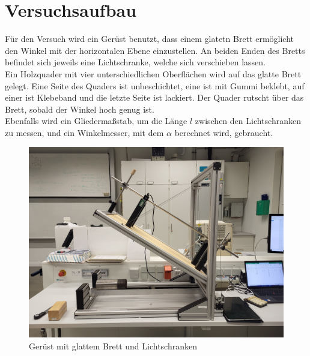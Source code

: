 \section{Versuchsaufbau}

Für den Versuch wird ein Gerüst benutzt, dass einem glatetn Brett ermöglicht den Winkel mit der horizontalen Ebene einzustellen. An beiden Enden des Bretts befindet sich jeweils eine Lichtschranke, welche sich verschieben lassen.\\
Ein Holzquader mit vier unterschiedlichen Oberflächen wird auf das glatte Brett gelegt. Eine Seite des Quaders ist unbeschichtet, eine ist mit Gummi beklebt, auf einer ist Klebeband und die letzte Seite ist lackiert. Der Quader rutscht über das Brett, sobald der Winkel hoch genug ist.\\
Ebenfalls wird ein Gliedermaßstab, um die Länge $l$ zwischen den Lichtschranken zu messen, und ein Winkelmesser, mit dem $\alpha$ berechnet wird, gebraucht.
\begin{figure}[ht]
    \centering
    \includegraphics[width=\linewidth/2]{images/Versuch-Aufbau.jpg}
    \caption[Aufbau]{Gerüst mit glattem Brett und Lichtschranken}
    \label{fig:Aufbau}
\end{figure}
